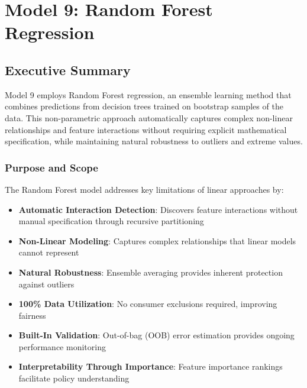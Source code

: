 
\chapter{Model 9: Random Forest Regression}\label{ch:model9}




\def\themodel{9}

\section{Executive Summary}

Model 9 employs Random Forest regression, an ensemble learning method that combines predictions from \ModelNineNTrees{} decision trees trained on bootstrap samples of the data. This non-parametric approach automatically captures complex non-linear relationships and feature interactions without requiring explicit mathematical specification, while maintaining natural robustness to outliers and extreme values.

\subsection{Purpose and Scope}

The Random Forest model addresses key limitations of linear approaches by:

\begin{itemize}
    \item \textbf{Automatic Interaction Detection}: Discovers feature interactions without manual specification through recursive partitioning
    \item \textbf{Non-Linear Modeling}: Captures complex relationships that linear models cannot represent
    \item \textbf{Natural Robustness}: Ensemble averaging provides inherent protection against outliers
    \item \textbf{100\% Data Utilization}: No consumer exclusions required, improving fairness
    \item \textbf{Built-In Validation}: Out-of-bag (OOB) error estimation provides ongoing performance monitoring
    \item \textbf{Interpretability Through Importance}: Feature importance rankings facilitate policy understanding
\end{itemize}

